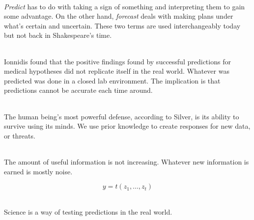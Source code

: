 \documentclass[12pt]{article}
\begin{document}

\begin{enumerate}

 \\ 
\emph{Predict} has to do with taking a sign of something and interpreting them to gain some advantage. On the other hand, \emph{forecast} deals with making plans under what's certain and uncertain. These two terms are used interchangeably today but not back in Shakespeare's time. 

 \\
Ionnidis found that the positive findings found by successful predictions for medical hypotheses did not replicate itself in the real world. Whatever was predicted was done in a closed lab environment. The implication is that predictions cannot be accurate each time around. 

 \\
The human being's most powerful defense, according to Silver, is its ability to survive using its minds. We use prior knowledge to create responses for new data, or threats. 


 \\
The amount of useful information is not increasing. Whatever new information is earned is mostly noise. 

$$ y = t(z_1, \dots, z_t) $$ 

 \\ 
Science is a way of testing predictions in the real world. 


\end{enumerate}
\end{document}
